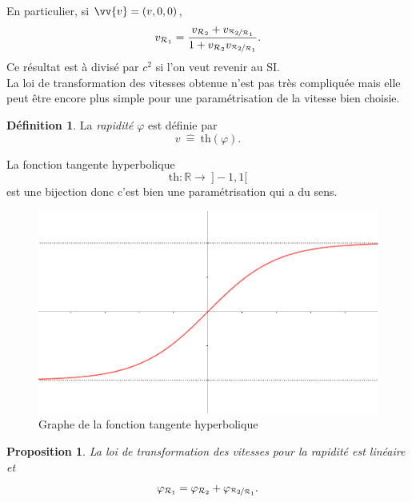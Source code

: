 \documentclass[a4paper,11pt]{report}
\theoremstyle{definition}
\theoremstyle{plain}
\newtheorem{prop}[thm]{Proposition}
\theoremstyle{definition}
\newtheorem{defn}{Définition}[chapter]
\theoremstyle{remark}
\renewcommand{\th}[1]{\text{th}(#1)}
\newcommand{\R}{\mathcal{R}}
\begin{document}
            En particulier, si $\vv{v} = (v,0,0)$, 
            \begin{equation}
                v_{\R_1}  = \frac{v_{\R_2}+v_{\nicefrac{\R_2}{\R_1}}}{1+v_{\R_2}v_{\nicefrac{\R_2}{\R_1}}}.
                \label{LTVx}
            \end{equation}
            Ce résultat est à divisé par $c^2$ si l'on veut revenir au SI.\\
            
            La loi de transformation des vitesses obtenue n'est pas très compliquée mais elle peut être encore plus simple pour une paramétrisation de la vitesse bien choisie.
            
            \begin{defn}
                La \textit{rapidité} $\varphi$ est définie par
                \begin{equation}
                    v~\hat{=}~\th{\varphi}.
                \end{equation}
            \end{defn}
            
            La fonction tangente hyperbolique 
            $$\text{th}:\mathbb{R}\to~ ]-1,1[$$ 
            est une bijection donc c'est bien une paramétrisation qui a du sens.
            
            \begin{figure}[H]
            \centering
            \includegraphics[scale = 0.4]{Tanh.PNG}
            \caption{Graphe de la fonction tangente hyperbolique}
            \end{figure}
            
            \begin{prop}
                La loi de transformation des vitesses pour la rapidité est linéaire et 
                \begin{equation}
                    \varphi_{\R_1} = \varphi_{\R_2}+\varphi_{\nicefrac{\R_2}{\R_1}}.
                \end{equation}
            \end{prop}
            
\end{document}
